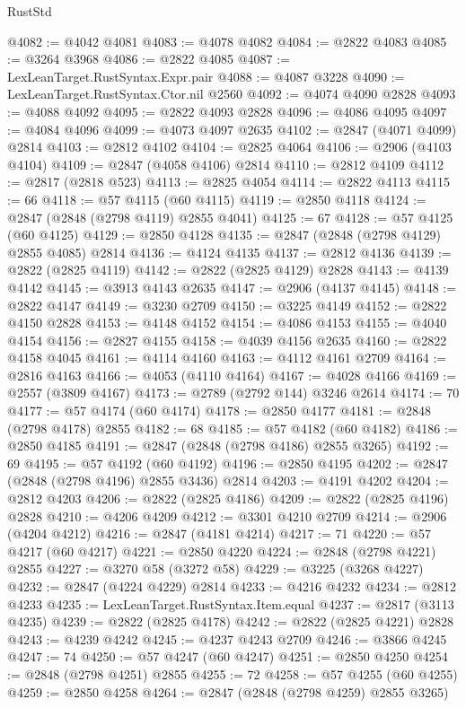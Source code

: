 \begin{lexlean}{RustStd}
\begin{coremodule}
@4082 := @4042 @4081
@4083 := @4078 @4082
@4084 := @2822 @4083
@4085 := @3264 @3968
@4086 := @2822 @4085
@4087 := LexLeanTarget.RustSyntax.Expr.pair
@4088 := @4087 @3228
@4090 := LexLeanTarget.RustSyntax.Ctor.nil @2560
@4092 := @4074 @4090 @2828
@4093 := @4088 @4092
@4095 := @2822 @4093 @2828
@4096 := @4086 @4095
@4097 := @4084 @4096
@4099 := @4073 @4097 @2635
@4102 := @2847 (@4071 @4099) @2814
@4103 := @2812 @4102
@4104 := @2825 @4064
@4106 := @2906 (@4103 @4104)
@4109 := @2847 (@4058 @4106) @2814
@4110 := @2812 @4109
@4112 := @2817 (@2818 @523)
@4113 := @2825 @4054
@4114 := @2822 @4113
@4115 := 66
@4118 := @57 @4115 (@60 @4115)
@4119 := @2850 @4118
@4124 := @2847 (@2848 (@2798 @4119) @2855 @4041)
@4125 := 67
@4128 := @57 @4125 (@60 @4125)
@4129 := @2850 @4128
@4135 := @2847 (@2848 (@2798 @4129) @2855 @4085) @2814
@4136 := @4124 @4135
@4137 := @2812 @4136
@4139 := @2822 (@2825 @4119)
@4142 := @2822 (@2825 @4129) @2828
@4143 := @4139 @4142
@4145 := @3913 @4143 @2635
@4147 := @2906 (@4137 @4145)
@4148 := @2822 @4147
@4149 := @3230 @2709
@4150 := @3225 @4149
@4152 := @2822 @4150 @2828
@4153 := @4148 @4152
@4154 := @4086 @4153
@4155 := @4040 @4154
@4156 := @2827 @4155
@4158 := @4039 @4156 @2635
@4160 := @2822 @4158 @4045
@4161 := @4114 @4160
@4163 := @4112 @4161 @2709
@4164 := @2816 @4163
@4166 := @4053 (@4110 @4164)
@4167 := @4028 @4166
@4169 := @2557 (@3809 @4167)
@4173 := @2789 (@2792 @144) @3246 @2614
@4174 := 70
@4177 := @57 @4174 (@60 @4174)
@4178 := @2850 @4177
@4181 := @2848 (@2798 @4178) @2855
@4182 := 68
@4185 := @57 @4182 (@60 @4182)
@4186 := @2850 @4185
@4191 := @2847 (@2848 (@2798 @4186) @2855 @3265)
@4192 := 69
@4195 := @57 @4192 (@60 @4192)
@4196 := @2850 @4195
@4202 := @2847 (@2848 (@2798 @4196) @2855 @3436) @2814
@4203 := @4191 @4202
@4204 := @2812 @4203
@4206 := @2822 (@2825 @4186)
@4209 := @2822 (@2825 @4196) @2828
@4210 := @4206 @4209
@4212 := @3301 @4210 @2709
@4214 := @2906 (@4204 @4212)
@4216 := @2847 (@4181 @4214)
@4217 := 71
@4220 := @57 @4217 (@60 @4217)
@4221 := @2850 @4220
@4224 := @2848 (@2798 @4221) @2855
@4227 := @3270 @58 (@3272 @58)
@4229 := @3225 (@3268 @4227)
@4232 := @2847 (@4224 @4229) @2814
@4233 := @4216 @4232
@4234 := @2812 @4233
@4235 := LexLeanTarget.RustSyntax.Item.equal
@4237 := @2817 (@3113 @4235)
@4239 := @2822 (@2825 @4178)
@4242 := @2822 (@2825 @4221) @2828
@4243 := @4239 @4242
@4245 := @4237 @4243 @2709
@4246 := @3866 @4245
@4247 := 74
@4250 := @57 @4247 (@60 @4247)
@4251 := @2850 @4250
@4254 := @2848 (@2798 @4251) @2855
@4255 := 72
@4258 := @57 @4255 (@60 @4255)
@4259 := @2850 @4258
@4264 := @2847 (@2848 (@2798 @4259) @2855 @3265)

\end{coremodule}
\end{lexlean}
